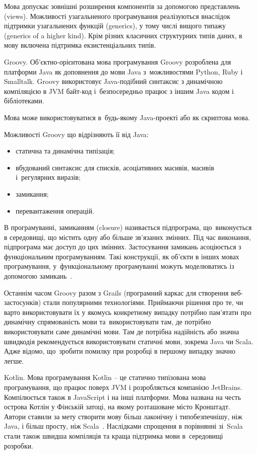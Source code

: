\documentclass[../main.tex]{subfiles}
\begin{document}
Мова допускає зовнішні розширення компонентів за допомогою представлень (views). Можливості узагальненого програмування реалізуються внаслідок підтримки узагальнених функцій (generics), у тому числі вищого типажу (generics of a higher kind). Крім різних класичних структурних типів даних, в мову включена підтримка екзистенціальних типів.

Groovy.
Об'єктно-орієнтована мова програмування Groovy розроблена для платформи Java як доповнення до мови Java з~можливостями Python, Ruby і Smalltalk. Groovy використовує Java-подібний синтаксис з динамічною компіляцією в JVM байт-код і~безпосередньо працює з іншим Java кодом і бібліотеками. 

Мова може використовуватися в~будь-якому Java-проекті або як скриптова мова. 

Можливості Groovy що відрізняють її від Java:
\begin{itemize}[label={--}]
	\item статична та динамічна типізація;
	\item вбудований синтаксис для списків, асоціативних масивів, масивів і~регулярних виразів;
	\item замикання;
	\item перевантаження операцій.
\end{itemize}

В програмуванні, замиканням (closure) називається підпрограма, що~виконується в середовищі, що містить одну або більше зв'язаних змінних. Під час виконання, підпрограма має доступ до цих змінних. Застосування замикань асоціюється з функціональним програмуванням. Такі конструкції, як об'єкти в інших мовах програмування, у~функціональному програмуванні можуть моделюватись із допомогою замикань~\cite{groovy}.

Останнім часом Groovy разом з Grails (програмний каркас для створення веб-застосунків) стали популярними технологіями. Приймаючи рішення про те, чи варто використовувати їх у якомусь конкретному випадку потрібно пам’ятати про динамічну спрямованість мови та~використовувати там, де потрібно використовувати саме динамічні мови. Там де потрібна надійність або значна швидкодія рекомендується використовувати статичні мови, зокрема Java чи Scala. Адже відомо, що~зробити помилку при розробці в першому випадку значно легше.

Kotlin.
Мова програмування Kotlin -- це статично типізована мова програмування, що працює поверх JVM і розробляється компанією JetBrains. Компілюється також в JavaScript і на інші платформи. Мова названа на честь острова Котлін у Фінській затоці, на якому розташоване місто Кронштадт. Автори ставили за мету створити мову більш лаконічну і типобезпечнішу, ніж Java, і більш просту, ніж Scala~\cite{open_systems}. Наслідками спрощення в порівнянні зі~Scala стали також швидша компіляція та краща підтримка мови в~середовищі розробки.
\end{document}
